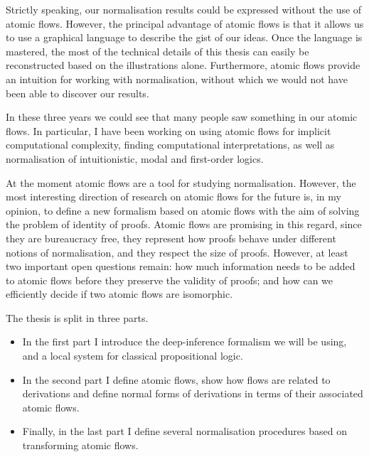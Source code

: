Strictly speaking, our normalisation results could be expressed without the use of atomic flows. However, the principal advantage of atomic flows is that it allows us to use a graphical language to describe the gist of our ideas. Once the language is mastered, the most of the technical details of this thesis can easily be reconstructed based on the illustrations alone. Furthermore, atomic flows provide an intuition for working with normalisation, without which we would not have been able to discover our results.

In these three years we could see that many people saw something in our atomic flows. In particular, I have been working on using atomic flows for implicit computational complexity, finding computational interpretations, as well as normalisation of intuitionistic, modal and first-order logics.

At the moment atomic flows are a tool for studying normalisation. However, the most interesting direction of research on atomic flows for the future is, in my opinion, to define a new formalism based on atomic flows with the aim of solving the problem of identity of proofs. Atomic flows are promising in this regard, since they are bureaucracy free, they represent how proofs behave under different notions of normalisation, and they respect the size of proofs. However, at least two important open questions remain: how much information needs to be added to atomic flows before they preserve the validity of proofs; and how can we efficiently decide if two atomic flows are isomorphic.


The thesis is split in three parts.
\begin{itemize}
\item In the first part I introduce the deep-inference formalism we will be using, and a local system for classical propositional logic.
\item In the second part I define atomic flows, show how flows are related to derivations and define normal forms of derivations in terms of their associated atomic flows.
\item Finally, in the last part I define several normalisation procedures based on transforming atomic flows.
\end{itemize}